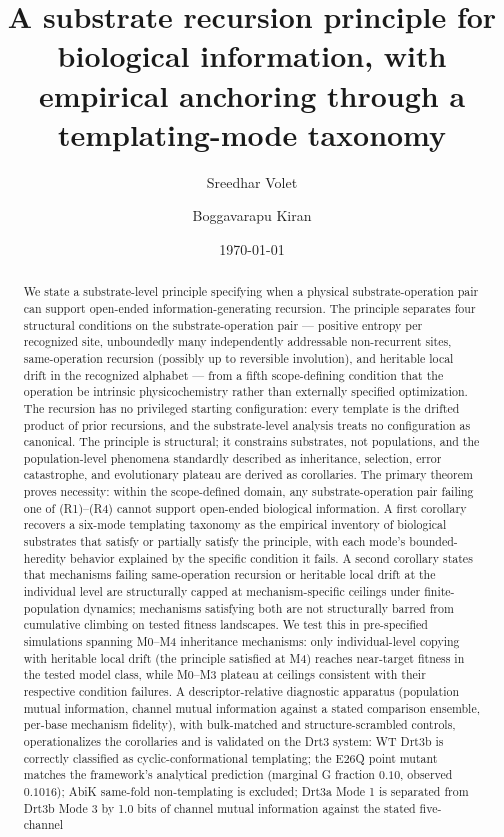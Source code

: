 \documentclass[aps,prx,reprint,amsmath,amssymb,floatfix,superscriptaddress,nofootinbib]{revtex4-2}
\theoremstyle{plain-thm}
\theoremstyle{definition-thm}
\begin{document}
\title{A substrate recursion principle for biological information, with empirical anchoring through a templating-mode taxonomy}

\author{Sreedhar Volet}

\author{Boggavarapu Kiran}

\date{\today}

\begin{abstract}
We state a substrate-level principle specifying when a physical substrate-operation pair can support open-ended information-generating recursion. The principle separates four structural conditions on the substrate-operation pair --- positive entropy per recognized site, unboundedly many independently addressable non-recurrent sites, same-operation recursion (possibly up to reversible involution), and heritable local drift in the recognized alphabet --- from a fifth scope-defining condition that the operation be intrinsic physicochemistry rather than externally specified optimization. The recursion has no privileged starting configuration: every template is the drifted product of prior recursions, and the substrate-level analysis treats no configuration as canonical. The principle is structural; it constrains substrates, not populations, and the population-level phenomena standardly described as inheritance, selection, error catastrophe, and evolutionary plateau are derived as corollaries. The primary theorem proves necessity: within the scope-defined domain, any substrate-operation pair failing one of (R1)--(R4) cannot support open-ended biological information. A first corollary recovers a six-mode templating taxonomy as the empirical inventory of biological substrates that satisfy or partially satisfy the principle, with each mode's bounded-heredity behavior explained by the specific condition it fails. A second corollary states that mechanisms failing same-operation recursion or heritable local drift at the individual level are structurally capped at mechanism-specific ceilings under finite-population dynamics; mechanisms satisfying both are not structurally barred from cumulative climbing on tested fitness landscapes. We test this in pre-specified simulations spanning M0--M4 inheritance mechanisms: only individual-level copying with heritable local drift (the principle satisfied at M4) reaches near-target fitness in the tested model class, while M0--M3 plateau at ceilings consistent with their respective condition failures. A descriptor-relative diagnostic apparatus (population mutual information, channel mutual information against a stated comparison ensemble, per-base mechanism fidelity), with bulk-matched and structure-scrambled controls, operationalizes the corollaries and is validated on the Drt3 system: WT Drt3b is correctly classified as cyclic-conformational templating; the E26Q point mutant matches the framework's analytical prediction (marginal G fraction $0.10$, observed $0.1016$); AbiK same-fold non-templating is excluded; Drt3a Mode 1 is separated from Drt3b Mode 3 by 1.0 bits of channel mutual information against the stated five-channel 
\end{abstract}
\end{document}
